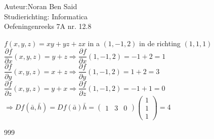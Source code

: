 \documentclass[a4paper]{article}
\begin{document}
  
\noindent \large Auteur:Noran Ben Said \\
\noindent \large Studierichting: Informatica\\
\noindent \large Oefeningenreeks 7A nr. 12.8\\

\medskip

\normalsize

$f(x, y, z) = xy + yz + zx$ in a $\left(1,-1,2\right)$ in de richting $\left(1,1,1\right)$\\

$\dfrac{\partial f}{\partial x}\left(x,y,z\right) = y + z \Rightarrow \dfrac{\partial f}{\partial x}\left(1,-1,2\right) = -1 + 2 = 1$\\

$\dfrac{\partial f}{\partial y}\left(x,y,z\right) = x + z \Rightarrow \dfrac{\partial f}{\partial y}\left(1,-1,2\right) = 1+2 = 3$\\

$\dfrac{\partial f}{\partial z}\left(x,y,z\right) = y + x \Rightarrow \dfrac{\partial f}{\partial z}\left(1,-1,2\right) = -1 + 1=0$\\

$\Rightarrow D f(\bar a, \bar h) = D f(\bar a)\bar h = \left( 
\begin{array}{ccc}
1 & 3 & 0
\end{array}
\right)
\left( 
\begin{array}{ccc}
1\\
1\\
1
\end{array}
\right)
= 4$\\

\begin{thebibliography}{999}
\end{thebibliography}
\end{document}
